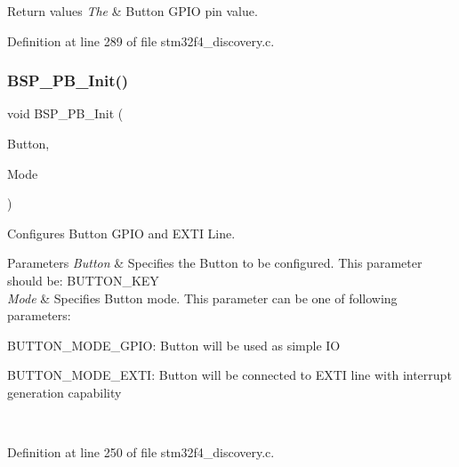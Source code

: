 \begin{DoxyRetVals}{Return values}
{\em The} & Button G\+P\+IO pin value. \\
\hline
\end{DoxyRetVals}


Definition at line 289 of file stm32f4\+\_\+discovery.\+c.

\mbox{\label{group___s_t_m32_f4___d_i_s_c_o_v_e_r_y___l_o_w___l_e_v_e_l___exported___functions_gaeece1cd3a2156a50bfa81638a27a1143}} 
\subsubsection{\texorpdfstring{B\+S\+P\+\_\+\+P\+B\+\_\+\+Init()}{BSP\_PB\_Init()}}
{\footnotesize\ttfamily void B\+S\+P\+\_\+\+P\+B\+\_\+\+Init (\begin{DoxyParamCaption}\item[{Button\+\_\+\+Type\+Def}]{Button,  }\item[{Button\+Mode\+\_\+\+Type\+Def}]{Mode }\end{DoxyParamCaption})}



Configures Button G\+P\+IO and E\+X\+TI Line. 


\begin{DoxyParams}{Parameters}
{\em Button} & Specifies the Button to be configured. This parameter should be\+: B\+U\+T\+T\+O\+N\+\_\+\+K\+EY \\
\hline
{\em Mode} & Specifies Button mode. This parameter can be one of following parameters\+: ~\newline
 \begin{DoxyItemize}
\item B\+U\+T\+T\+O\+N\+\_\+\+M\+O\+D\+E\+\_\+\+G\+P\+IO\+: Button will be used as simple IO \item B\+U\+T\+T\+O\+N\+\_\+\+M\+O\+D\+E\+\_\+\+E\+X\+TI\+: Button will be connected to E\+X\+TI line with interrupt generation capability \end{DoxyItemize}
\\
\hline
\end{DoxyParams}


Definition at line 250 of file stm32f4\+\_\+discovery.\+c.

